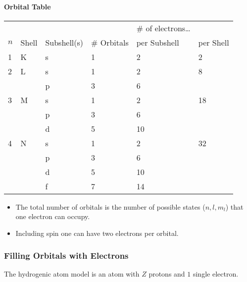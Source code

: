 \paragraph{Orbital Table}
\renewcommand{\arraystretch}{1.1}
\setlength{\oldtabcolsep}{\tabcolsep}\setlength\tabcolsep{3pt}
{\small     %
    \begin{tabularx}{\linewidth}{@{}llllll@{}}
            &       &             &             & \# of electrons\dots             \\
        $n$ & Shell & Subshell(s) & \# Orbitals & per Subshell         & per Shell \\
        1   & K     & s           & 1           & 2                    & 2         \\
        2   & L     & s           & 1           & 2                    & 8         \\
            &       & p           & 3           & 6                    &           \\
        3   & M     & s           & 1           & 2                    & 18        \\
            &       & p           & 3           & 6                    &           \\
            &       & d           & 5           & 10                   &           \\
        4   & N     & s           & 1           & 2                    & 32        \\
            &       & p           & 3           & 6                    &           \\
            &       & d           & 5           & 10                   &           \\
            &       & f           & 7           & 14                   &
    \end{tabularx}
}           %
\renewcommand{\arraystretch}{1}
\setlength{\tabcolsep}{\oldtabcolsep}


\begin{itemize}
    \item The total number of orbitals is the number of possible states ($n,l,m_l$) that one electron can occupy.
    \item Including spin one can have two electrons per orbital.
\end{itemize}

\subsubsection{Filling Orbitals with Electrons}
The hydrogenic atom model is an atom with $Z$ protons and $1$ single electron.
